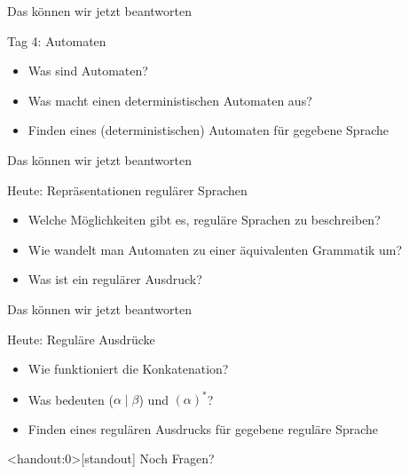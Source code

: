 \begin{frame}[fragile]{Das können wir jetzt beantworten}
    \begin{alertblock}{Tag 4: Automaten}
        \begin{itemize}
            \item Was sind Automaten?
            \item Was macht einen deterministischen Automaten aus?
            \item Finden eines (deterministischen) Automaten für gegebene Sprache
        \end{itemize}
    \end{alertblock}
\end{frame}



\begin{frame}[fragile]{Das können wir jetzt beantworten}
    \begin{alertblock}{Heute: Repräsentationen regulärer Sprachen}
        \begin{itemize}
            \item Welche Möglichkeiten gibt es, reguläre Sprachen zu beschreiben?
            \item Wie wandelt man Automaten zu einer äquivalenten Grammatik um?
            \item Was ist ein regulärer Ausdruck?
        \end{itemize}
    \end{alertblock}
\end{frame}

\begin{frame}[fragile]{Das können wir jetzt beantworten}
    \begin{alertblock}{Heute: Reguläre Ausdrücke}
        \begin{itemize}
            \item Wie funktioniert die Konkatenation?
            \item Was bedeuten ($\alpha \mid \beta$) und $(\alpha)^*$?
            \item Finden eines regulären Ausdrucks für gegebene reguläre Sprache
        \end{itemize}
    \end{alertblock}
\end{frame}

\begin{frame}<handout:0>[standout]
    Noch Fragen?
\end{frame}

